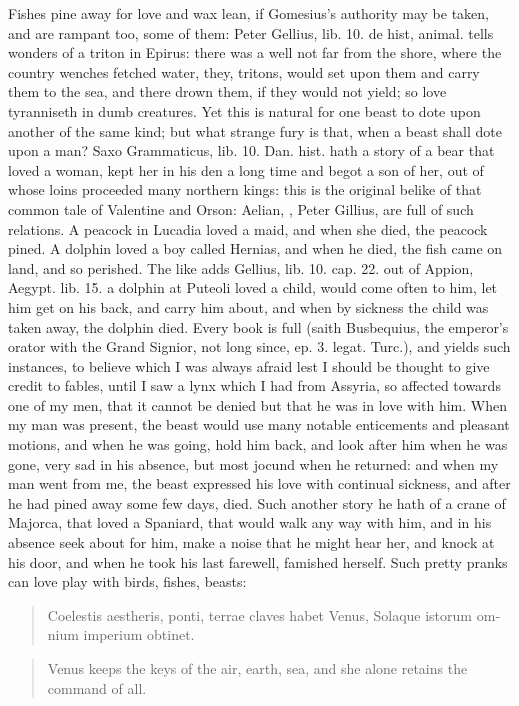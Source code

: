 Fishes pine away for love and wax lean, if Gomesius's authority
may be taken, and are rampant too, some of them: Peter Gellius, lib.
10. de hist, animal. tells wonders of a triton in Epirus: there was a
well not far from the shore, where the country wenches fetched water,
they, tritons,  would set upon them and carry them to
the sea, and there drown them, if they would not yield; so love
tyranniseth in dumb creatures. Yet this is natural for one beast to
dote upon another of the same kind; but what strange fury is that, when
a beast shall dote upon a man? Saxo Grammaticus, lib. 10. Dan. hist.
hath a story of a bear that loved a woman, kept her in his den a long
time and begot a son of her, out of whose loins proceeded many northern
kings: this is the original belike of that common tale of Valentine and
Orson: Aelian, \Pliny{}, Peter Gillius, are full of such relations. A
peacock in Lucadia loved a maid, and when she died, the peacock pined.
A dolphin loved a boy called Hernias, and when he died, the fish
came on land, and so perished. The like adds Gellius, lib. 10. cap. 22.
out of Appion, Aegypt. lib. 15. a dolphin at Puteoli loved a child,
would come often to him, let him get on his back, and carry him about,
and when by sickness the child was taken away, the dolphin died.
Every book is full (saith Busbequius, the emperor's orator with
the Grand Signior, not long since, ep. 3. legat. Turc.), and yields
such instances, to believe which I was always afraid lest I should be
thought to give credit to fables, until I saw a lynx which I had from
Assyria, so affected towards one of my men, that it cannot be denied
but that he was in love with him. When my man was present, the beast
would use many notable enticements and pleasant motions, and when he
was going, hold him back, and look after him when he was gone, very sad
in his absence, but most jocund when he returned: and when my man went
from me, the beast expressed his love with continual sickness, and
after he had pined away some few days, died. Such another story he hath
of a crane of Majorca, that loved a Spaniard, that would walk any way
with him, and in his absence seek about for him, make a noise that he
might hear her, and knock at his door, and when he took his last
farewell, famished herself. Such pretty pranks can love play with
birds, fishes, beasts:

\begin{latin}
\begin{verse}%
Coelestis aestheris, ponti, terrae claves habet Venus,
Solaque istorum omnium imperium obtinet.
\end{verse}%
\end{latin}
\translationrule%
\begin{verse}%
Venus keeps the keys of the air, earth, sea,
and she alone retains the command of all.
\end{verse}%

